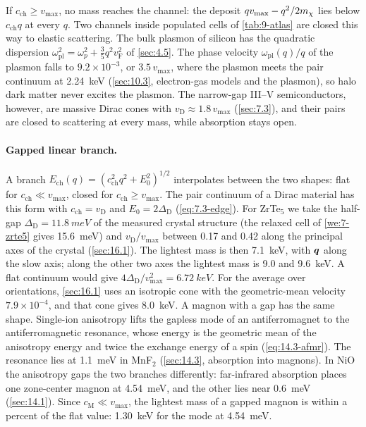 If $c_{\mathrm{ch}} \ge v_{\mathrm{max}}$, no mass reaches the channel: the deposit $qv_{\mathrm{max}} - q^2/2m_{\chi}$ lies below $c_{\mathrm{ch}}q$ at every $q$. Two channels inside populated cells of \cref{tab:9-atlas} are closed this way to elastic scattering. The bulk plasmon of silicon has the quadratic dispersion $\omega_{\mathrm{pl}}^2 = \omega_p^2 + \tfrac35q^2v_{\mathrm{F}}^2$ of \cref{sec:4.5}. The phase velocity $\omega_{\mathrm{pl}}(q)/q$ of the plasmon falls to $9.2\times10^{-3}$, or $3.5\,v_{\mathrm{max}}$, where the plasmon meets the pair continuum at \SI{2.24}{keV} (\cref{sec:10.3}, electron-gas models and the plasmon), so halo dark matter never excites the plasmon. The narrow-gap III--V semiconductors, however, are massive Dirac cones with $v_{\mathrm{D}} \approx 1.8\,v_{\mathrm{max}}$ (\cref{sec:7.3}), and their pairs are closed to scattering at every mass, while absorption stays open.

\paragraph{Gapped linear branch.} A branch $E_{\mathrm{ch}}(q) = (c_{\mathrm{ch}}^2q^2 + E_0^2)^{1/2}$ interpolates between the two shapes: flat for $c_{\mathrm{ch}} \ll v_{\mathrm{max}}$, closed for $c_{\mathrm{ch}} \ge v_{\mathrm{max}}$. The pair continuum of a Dirac material has this form with $c_{\mathrm{ch}} = v_{\mathrm{D}}$ and $E_0 = 2\Delta_{\mathrm{D}}$ (\cref{eq:7.3-edge}). For ZrTe$_5$ we take the half-gap $\Delta_{\mathrm{D}} = \SI{11.8}{meV}$ of the measured crystal structure (the relaxed cell of \cref{we:7-zrte5} gives \SI{15.6}{meV}) and $v_{\mathrm{D}}/v_{\mathrm{max}}$ between 0.17 and 0.42 along the principal axes of the crystal (\cref{sec:16.1}). The lightest mass is then \SI{7.1}{keV}, with $\bm{q}$ along the slow axis; along the other two axes the lightest mass is 9.0 and \SI{9.6}{keV}. A flat continuum would give $4\Delta_{\mathrm{D}}/v_{\mathrm{max}}^2 = \SI{6.72}{keV}$. For the average over orientations, \cref{sec:16.1} uses an isotropic cone with the geometric-mean velocity $7.9\times10^{-4}$, and that cone gives \SI{8.0}{keV}. A magnon with a gap has the same shape. Single-ion anisotropy lifts the gapless mode of an antiferromagnet to the antiferromagnetic resonance, whose energy is the geometric mean of the anisotropy energy and twice the exchange energy of a spin (\cref{eq:14.3-afmr}). The resonance lies at \SI{1.1}{meV} in MnF$_2$ (\cref{sec:14.3}, absorption into magnons). In NiO the anisotropy gaps the two branches differently: far-infrared absorption places one zone-center magnon at \SI{4.54}{meV}, and the other lies near \SI{0.6}{meV} (\cref{sec:14.1}). Since $c_{\mathrm{M}} \ll v_{\mathrm{max}}$, the lightest mass of a gapped magnon is within a percent of the flat value: \SI{1.30}{keV} for the mode at \SI{4.54}{meV}.

